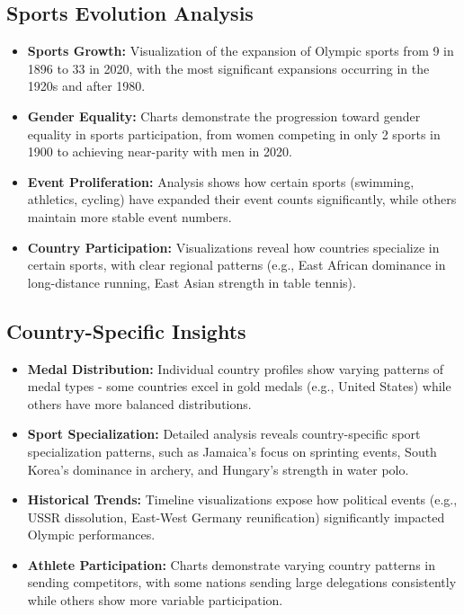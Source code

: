 \documentclass[a4paper, 12pt]{article}
\begin{document}
\subsection{Sports Evolution Analysis}
\begin{itemize}[leftmargin=*]
    \item \textbf{Sports Growth:} Visualization of the expansion of Olympic sports from 9 in 1896 to 33 in 2020, with the most significant expansions occurring in the 1920s and after 1980.
    
    \item \textbf{Gender Equality:} Charts demonstrate the progression toward gender equality in sports participation, from women competing in only 2 sports in 1900 to achieving near-parity with men in 2020.
    
    \item \textbf{Event Proliferation:} Analysis shows how certain sports (swimming, athletics, cycling) have expanded their event counts significantly, while others maintain more stable event numbers.
    
    \item \textbf{Country Participation:} Visualizations reveal how countries specialize in certain sports, with clear regional patterns (e.g., East African dominance in long-distance running, East Asian strength in table tennis).
\end{itemize}

\subsection{Country-Specific Insights}
\begin{itemize}[leftmargin=*]
    \item \textbf{Medal Distribution:} Individual country profiles show varying patterns of medal types - some countries excel in gold medals (e.g., United States) while others have more balanced distributions.
    
    \item \textbf{Sport Specialization:} Detailed analysis reveals country-specific sport specialization patterns, such as Jamaica's focus on sprinting events, South Korea's dominance in archery, and Hungary's strength in water polo.
    
    \item \textbf{Historical Trends:} Timeline visualizations expose how political events (e.g., USSR dissolution, East-West Germany reunification) significantly impacted Olympic performances.
    
    \item \textbf{Athlete Participation:} Charts demonstrate varying country patterns in sending competitors, with some nations sending large delegations consistently while others show more variable participation.
\end{itemize}
\end{document}
